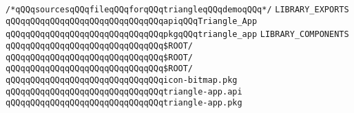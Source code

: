 \label{src/lib/x-kit/tut/triangle/triangle-app.lib}
\verb|/*qQQqsourcesqQQqfileqQQqforqQQqtriangleqQQqdemoqQQq*/|\newline
\newline
\verb|LIBRARY_EXPORTS|\newline
\newline
\verb|qQQqqQQqqQQqqQQqqQQqqQQqqQQqqQQqapiqQQqTriangle_App|\newline
\verb|qQQqqQQqqQQqqQQqqQQqqQQqqQQqqQQqpkgqQQqtriangle_app|\newline
\newline
\verb|LIBRARY_COMPONENTS|\newline
\newline
\verb|qQQqqQQqqQQqqQQqqQQqqQQqqQQqqQQq$ROOT/|\newline
\verb|qQQqqQQqqQQqqQQqqQQqqQQqqQQqqQQq$ROOT/|\newline
\verb|qQQqqQQqqQQqqQQqqQQqqQQqqQQqqQQq$ROOT/|\newline
\newline
\verb|qQQqqQQqqQQqqQQqqQQqqQQqqQQqqQQqicon-bitmap.pkg|\newline
\newline
\verb|qQQqqQQqqQQqqQQqqQQqqQQqqQQqqQQqtriangle-app.api|\newline
\verb|qQQqqQQqqQQqqQQqqQQqqQQqqQQqqQQqtriangle-app.pkg|\newline
\newline

